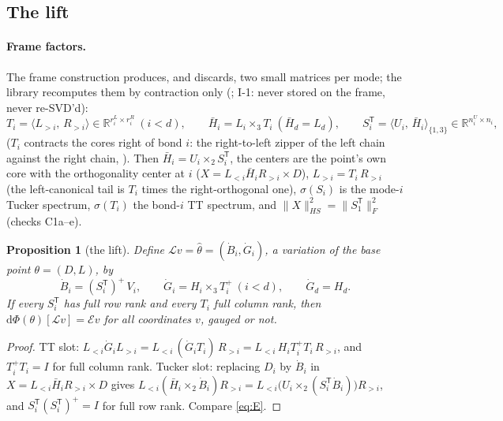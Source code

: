 \documentclass[11pt]{article}
\newcommand{\R}{\mathbb{R}}
\newcommand{\Lift}{\mathcal{L}}
\newcommand{\Emap}{\mathcal{E}}
\newcommand{\T}{\mathsf{T}}
\newcommand{\ip}[2]{\langle #1,\, #2\rangle}
\renewcommand{\th}{\theta}
\newcommand{\thh}{\hat\theta}
\theoremstyle{definition}
\theoremstyle{plain}
\newtheorem{proposition}{Proposition}
\begin{document}
\subsection{The lift}
\label{sec:lift}

\paragraph{Frame factors.} The frame construction produces, and discards, two small matrices per mode; the library
recomputes them by contraction only (; I-1: never stored on the frame, never re-SVD'd):
\begin{equation}
  \label{eq:factors}
  T_i = \ip{L_{>i}}{R_{>i}}\in\R^{r^L_i\times r^R_i}\ (i<d),\qquad
  \bar H_i = L_i\times_3T_i\ (\bar H_d=L_d),\qquad
  S_i^\T = \ip{U_i}{\bar H_i}_{\{1,3\}}\in\R^{n^U_i\times n_i},
\end{equation}
($T_i$ contracts the cores right of bond $i$: the right-to-left zipper of the left chain against the right chain,
). Then $\bar H_i=U_i\times_2S_i^\T$, the centers are the point's own core with the
orthogonality center at $i$ ($X=L_{<i}\bar H_iR_{>i}\times D$), $L_{>i}=T_i\,R_{>i}$ (the left-canonical tail is
$T_i$ times the right-orthogonal one), $\sigma(S_i)$ is the mode-$i$ Tucker spectrum, $\sigma(T_i)$ the bond-$i$
TT spectrum, and $\|X\|^2_{HS}=\|S_1^\T\|_F^2$ (checks C1a--e).

\begin{proposition}[the lift]
\label{prop:lift}
Define $\Lift v=\thh=(\dot B_i,\dot G_i)$, a variation of the base point $\th=(D,L)$, by
\begin{equation}
  \label{eq:lift}
  \dot B_i = (S_i^\T)^{+}\,V_i,\qquad
  \dot G_i = H_i\times_3 T_i^{+}\ (i<d),\qquad \dot G_d=H_d .
\end{equation}
If every $S_i^\T$ has full row rank and every $T_i$ full column rank, then $\mathrm d\Phi(\th)[\Lift v]=\Emap v$ for
\emph{all} coordinates $v$, gauged or not.
\end{proposition}

\begin{proof}
TT slot: $L_{<i}\dot G_iL_{>i}=L_{<i}\,(\dot G_iT_i)\,R_{>i}=L_{<i}\,H_i T_i^+T_i\,R_{>i}$, and $T_i^+T_i=I$
for full column rank. Tucker slot: replacing $D_i$ by $\dot B_i$ in $X=L_{<i}\bar H_iR_{>i}\times D$ gives
$L_{<i}(\bar H_i\times_2\dot B_i)R_{>i}=L_{<i}\big(U_i\times_2(S_i^\T\dot B_i)\big)R_{>i}$, and $S_i^\T(S_i^\T)^+=I$
for full row rank. Compare \eqref{eq:E}.
\end{proof}
\end{document}
